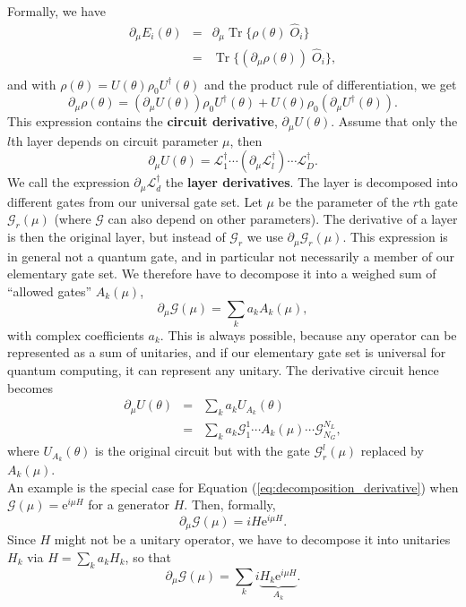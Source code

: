 \documentclass[aps,pra,10pt,twocolumn,groupedaddress,nofootinbib]{revtex4-1}
\theoremstyle{plain}
\DeclareMathOperator{\tr}{Tr}
\newcommand{\e}{\mathrm{e}}
\newcommand{\G}{\mathcal{G}}
\begin{document}
Formally, we have
\begin{eqnarray*}
        \partial_{\mu} E_i(\theta) &=& \partial_{\mu} \tr \{\rho(\theta) \; \hat{O}_i\} \\
        &=& \tr \{ (\partial_{\mu}  \rho(\theta)) \; \hat{O}_i\}, \\
\end{eqnarray*}
and with $\rho(\theta) = U(\theta)\rho_0U^{\dagger}(\theta)$ and the product rule of differentiation, we get
\[\partial_{\mu}  \rho(\theta) = \left(\partial_{\mu}   U(\theta)\right) \rho_0U^{\dagger}(\theta) +   U(\theta) \rho_0 \left(\partial_{\mu} U^{\dagger}(\theta)\right)   . \]
This expression contains the \textbf{circuit derivative},
$\partial_{\mu}  U(\theta)$. Assume that only the $l$th layer depends
on circuit parameter $\mu$, then
\[
\partial_{\mu}  U(\theta) =  \mathcal{L}_1^{\dagger} \cdots (\partial_{\mu} \mathcal{L}_l^{\dagger})\cdots \mathcal{L}_D^{\dagger}.
\]
We call the expression $\partial_{\mu} \mathcal{L}_d^{\dagger}$  the
\textbf{layer derivatives}. The layer is decomposed into different
gates from our universal gate set. Let $\mu$ be the parameter of the
$r$th gate $\G_r(\mu)$ (where $\G$ can also depend on other
parameters). The derivative of a layer is then the original layer, but
instead of $\G_r$ we use $\partial_{\mu} \G_r(\mu)$. This expression
is in general not a quantum gate, and in particular not necessarily a
member of our elementary gate set. We therefore have to decompose it
into a weighed sum of ``allowed gates'' $A_k(\mu)$,
\begin{equation}
        \partial_{\mu} \G(\mu) = \sum_k a_k A_k(\mu),
    \label{eq:decomposition_derivative}
\end{equation}
with complex coefficients $a_k$. This is always possible, because any
operator can be represented as a sum of unitaries, and if our
elementary gate set is universal for quantum computing, it can
represent any unitary. The derivative circuit hence becomes
\begin{eqnarray}
\partial_{\mu}  U(\theta)  &=& \sum_k a_k U_{A_k}(\theta) \\
&=& \sum_k a_k \G_1^1 \cdots A_k(\mu) \cdots \G_{N_G}^{N_L},
\end{eqnarray}
where $U_{A_k}(\theta)$ is the original circuit but with the gate $\G_r^l(\mu)$ replaced by $A_k(\mu)$. \\



An example is the special case for Equation (\ref{eq:decomposition_derivative}) when $\G(\mu) = \e^{i\mu H}$ for a generator $H$. Then, formally,
\[
\partial_{\mu}\G(\mu) = i H \e^{i\mu H}.
\]
Since $H$ might not be a unitary operator, we have to decompose it into unitaries $H_k$ via $H = \sum_k a_k H_k$, so that
\[
\partial_{\mu}\G(\mu) = \sum_k i \underbrace{H_k \e^{i\mu H}}_{A_k}.
\]
\end{document}
